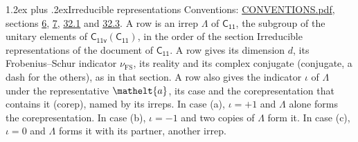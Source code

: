 \documentclass[10pt,a4paper]{article}
\makeatletter
\renewcommand\section{\@startsection{section}{1}{\z@}{-3ex plus -1ex minus -.2ex}%
  {1.2ex plus .2ex}{\normalfont\large\sffamily\bfseries\color{parttitle}}}
\numberwithin{equation}{section}
\newcommand{\eltfont}[1]{{\let\sigma\eltsigma\mathelt{#1}}}
\newcommand{\grp}[1]{\mathsf{#1}}
\newcommand{\elt}[1]{\eltfont{#1}}
\newcommand{\fsind}{\nu_{\mathrm{FS}}}
\makeatother
\begin{document}
\section{Irreducible representations}\label{s:irreps}
Conventions: \href{../../CONVENTIONS.pdf}{CONVENTIONS.pdf}, sections \href{../../../rotation/CONVENTIONS.pdf\#conv.6}{6}, \href{../../../rotation/CONVENTIONS.pdf\#conv.7}{7}, \href{../../CONVENTIONS.pdf\#conv.32.1}{32.1} and \href{../../CONVENTIONS.pdf\#conv.32.3}{32.3}.
\leavevmode\label{n:irrep.Delta}A row is an irrep $\Lambda$ of $\grp{C_{11}}$, the subgroup of the unitary elements of $\grp{C_{11v}}(\grp{C_{11}})$, in the order of the section Irreducible representations of the document of \href{../../../rotation/data/pdf/C11.pdf}{$\grp{C_{11}}$}. \label{n:index.dimension}\label{n:index.frobenius}\label{n:head.irrep}\label{n:head.reality}\label{n:head.conjugate}A row gives its dimension $d$, its Frobenius--Schur indicator $\fsind$, its reality and its complex conjugate (conjugate, a dash for the others), as in that section. \label{n:head.case.corep}\label{n:head.corep}A row also gives the indicator $\iota$ of $\Lambda$ under the representative $\elt{a}$, its case and the corepresentation that contains it (corep), named by its irreps. In case (a), $\iota = +1$ and $\Lambda$ alone forms the corepresentation. In case (b), $\iota = -1$ and two copies of $\Lambda$ form it. In case (c), $\iota = 0$ and $\Lambda$ forms it with its partner, another irrep.
\setlength{\emergencystretch}{2em}\par\setlength{\emergencystretch}{0pt}
\end{document}
